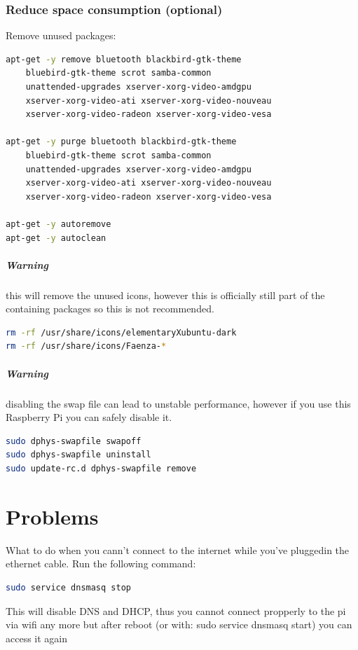 \documentclass[11pt]{report}
\begin{document}
		\subsection{Reduce space consumption (optional)}
			Remove unused packages:
			\begin{lstlisting}[language=sh]
apt-get -y remove bluetooth blackbird-gtk-theme 
	bluebird-gtk-theme scrot samba-common 
	unattended-upgrades xserver-xorg-video-amdgpu 
	xserver-xorg-video-ati xserver-xorg-video-nouveau 
	xserver-xorg-video-radeon xserver-xorg-video-vesa 

apt-get -y purge bluetooth blackbird-gtk-theme 
	bluebird-gtk-theme scrot samba-common 
	unattended-upgrades xserver-xorg-video-amdgpu 
	xserver-xorg-video-ati xserver-xorg-video-nouveau 
	xserver-xorg-video-radeon xserver-xorg-video-vesa 

apt-get -y autoremove
apt-get -y autoclean
			\end{lstlisting}
			\paragraph{Warning} this will remove the unused icons, however this is officially still part of the containing packages so this is not recommended.
			\begin{lstlisting}[language=sh]
rm -rf /usr/share/icons/elementaryXubuntu-dark
rm -rf /usr/share/icons/Faenza-*
			\end{lstlisting}
			\paragraph{Warning} disabling the swap file can lead to unstable performance, however if you use this Raspberry Pi you can safely disable it.
			\begin{lstlisting}[language=sh]
sudo dphys-swapfile swapoff
sudo dphys-swapfile uninstall
sudo update-rc.d dphys-swapfile remove
			\end{lstlisting}

\chapter{Problems}
	What to do when you cann't connect to the internet while you've pluggedin the ethernet cable. Run the following command:
	\begin{lstlisting}[language=sh]
sudo service dnsmasq stop
	\end{lstlisting} 
	This will disable DNS and DHCP, thus you cannot connect propperly to the pi via wifi any more but after reboot (or with: sudo service dnsmasq start) you can access it again
\end{document}
